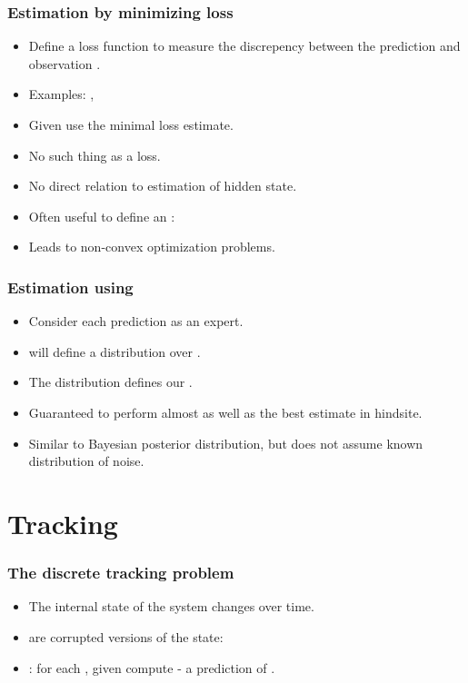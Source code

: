 \documentclass{beamer}
\begin{document}
\begin{frame}
\frametitle{Estimation by minimizing loss}
\begin{itemize}
\item Define a loss function to measure the discrepency between the
  prediction  and observation .
\item Examples: , 
\item Given  use the minimal loss estimate.
\item No such thing as a  loss. 
\item No direct relation to estimation of hidden state.
\item Often useful to define an :
\item Leads to non-convex optimization problems.
\end{itemize}
\end{frame}

\begin{frame}
\frametitle{Estimation using \ouralg}
\begin{itemize}
\item Consider each prediction  as an expert.
\item \ouralg will define a distribution over .
\item The distribution defines our .
\item Guaranteed to perform almost as well as the best estimate in hindsite.
\item Similar to Bayesian posterior distribution, but does not assume
  known distribution of noise.
\end{itemize}
\end{frame}

\section{Tracking}

\begin{frame}
\frametitle{The discrete {\bf tracking} problem}
\begin{itemize}
\item The internal state of the system changes  over
  time. \newline
{}
\item {} are corrupted versions of the state: 
\item {}: for each , given 
compute  - a prediction of .
\end{itemize}
\end{frame}
\end{document}
